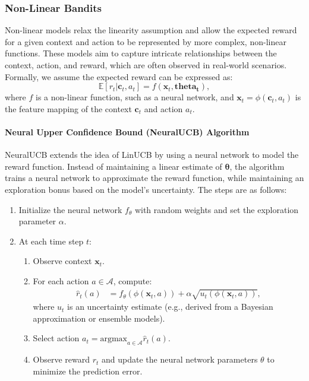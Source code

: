 \subsubsection{Non-Linear Bandits}
Non-linear models relax the linearity assumption and allow the expected reward for a given context and action to be represented by more complex, non-linear functions. These models aim to capture intricate relationships between the context, action, and reward, which are often observed in real-world scenarios. Formally, we assume the expected reward can be expressed as:
\begin{equation}
    \mathbb{E}[r_t | \mathbf{c}_t, a_t] = f(\mathbf{x}_t, \boldsymbol{theta_t}),
\end{equation}
where $f$ is a non-linear function, such as a neural network, and $\mathbf{x}_t  = \phi(\mathbf{c}_t, a_t)$ is the feature mapping of the context $\mathbf{c}_t$ and action $a_t$.

\paragraph{Neural Upper Confidence Bound (NeuralUCB) Algorithm}
NeuralUCB extends the idea of LinUCB by using a neural network to model the reward function. Instead of maintaining a linear estimate of $\boldsymbol{\theta}$, the algorithm trains a neural network to approximate the reward function, while maintaining an exploration bonus based on the model’s uncertainty. The steps are as follows:
\begin{enumerate}
    \item Initialize the neural network $f_\theta$ with random weights and set the exploration parameter $\alpha$.
    \item At each time step $t$:
    \begin{enumerate}
        \item Observe context $\mathbf{x}_t$.
        \item For each action $a \in \mathcal{A}$, compute:
        \begin{align*}
            \hat{r}_t(a) &= f_\theta(\phi(\mathbf{x}_t, a)) + \alpha \sqrt{u_t(\phi(\mathbf{x}_t, a))},
        \end{align*}
        where $u_t$ is an uncertainty estimate (e.g., derived from a Bayesian approximation or ensemble models).
        \item Select action $a_t = \text{argmax}_{a \in \mathcal{A}} \hat{r}_t(a)$.
        \item Observe reward $r_t$ and update the neural network parameters $\theta$ to minimize the prediction error.
    \end{enumerate}
\end{enumerate}

